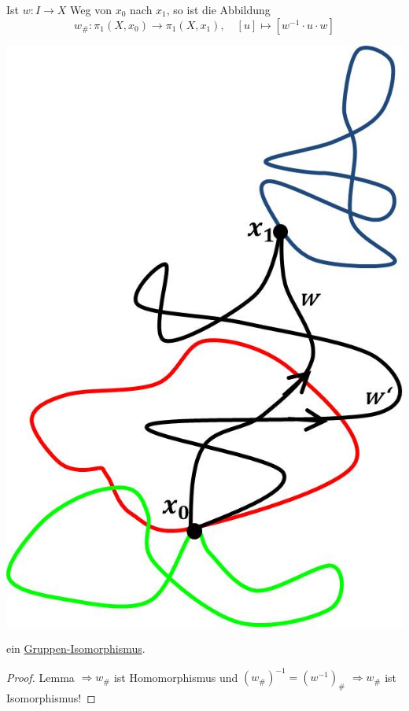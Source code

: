\documentclass[a4paper,11pt,notitlepage]{report}
\theoremstyle{definition}
\begin{document}
\begin{theorem}
	Ist $w \colon I \rightarrow X$ Weg von $x_0$ nach $x_1$, so ist die Abbildung 
	$$w_\# \colon \pi_1(X,x_0) \rightarrow \pi_1(X,x_1), \quad [u] \mapsto [w^{-1} \cdot u \cdot w]$$ 
	\begin{center}
		\includegraphics[scale=0.4]{images/Basispunkt_Unabhaengigkeit.jpg}
	\end{center}
	ein \underline{Gruppen-Isomorphismus}.
\end{theorem}

\begin{proof}
	Lemma $\Rightarrow w_\#$ ist Homomorphismus und $(w_\#)^{-1} = (w^{-1})_\#$ \newline $\Rightarrow w_\#$ ist Isomorphismus!
\end{proof}
\end{document}
